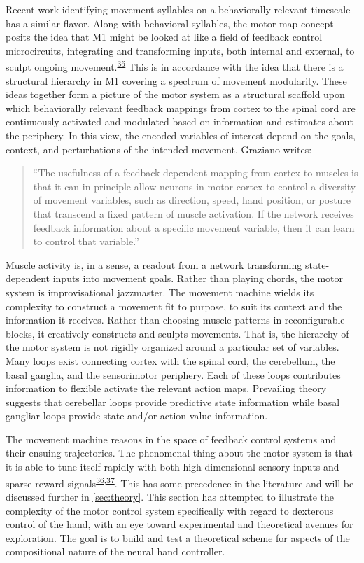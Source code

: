 \documentclass[
  a4paper,
]{article}
\begin{document}
Recent work identifying movement syllables on a behaviorally relevant
timescale has a similar flavor. Along with behavioral syllables, the
motor map concept posits the idea that M1 might be looked at like a
field of feedback control microcircuits, integrating and transforming
inputs, both internal and external, to sculpt ongoing
movement.\textsuperscript{\protect\hyperlink{ref-wiltschkoMappingSubSecondStructure2015}{35}}
This is in accordance with the idea that there is a structural hierarchy
in M1 covering a spectrum of movement modularity. These ideas together
form a picture of the motor system as a structural scaffold upon which
behaviorally relevant feedback mappings from cortex to the spinal cord
are continuously activated and modulated based on information and
estimates about the periphery. In this view, the encoded variables of
interest depend on the goals, context, and perturbations of the intended
movement. Graziano writes:

\begin{quote}
``The usefulness of a feedback-dependent mapping from cortex to muscles
is that it can in principle allow neurons in motor cortex to control a
diversity of movement variables, such as direction, speed, hand
position, or posture that transcend a fixed pattern of muscle
activation. If the network receives feedback information about a
specific movement variable, then it can learn to control that
variable.''
\end{quote}

Muscle activity is, in a sense, a readout from a network transforming
state-dependent inputs into movement goals. Rather than playing chords,
the motor system is improvisational jazzmaster. The movement machine
wields its complexity to construct a movement fit to purpose, to suit
its context and the information it receives. Rather than choosing muscle
patterns in reconfigurable blocks, it creatively constructs and sculpts
movements. That is, the hierarchy of the motor system is not rigidly
organized around a particular set of variables. Many loops exist
connecting cortex with the spinal cord, the cerebellum, the basal
ganglia, and the sensorimotor periphery. Each of these loops contributes
information to flexible activate the relevant action maps. Prevailing
theory suggests that cerebellar loops provide predictive state
information while basal gangliar loops provide state and/or action value
information.

The movement machine reasons in the space of feedback control systems
and their ensuing trajectories. The phenomenal thing about the motor
system is that it is able to tune itself rapidly with both
high-dimensional sensory inputs and sparse reward
signals\textsuperscript{\protect\hyperlink{ref-bahlNeuralDynamicPoliciesfor2020}{36},\protect\hyperlink{ref-ijspeertDynamicalMovementPrimitives2013}{37}}.
This has some precedence in the literature and will be discussed further
in \cref{sec:theory}. This section has attempted to illustrate the
complexity of the motor control system specifically with regard to
dexterous control of the hand, with an eye toward experimental and
theoretical avenues for exploration. The goal is to build and test a
theoretical scheme for aspects of the compositional nature of the neural
hand controller.
\end{document}
